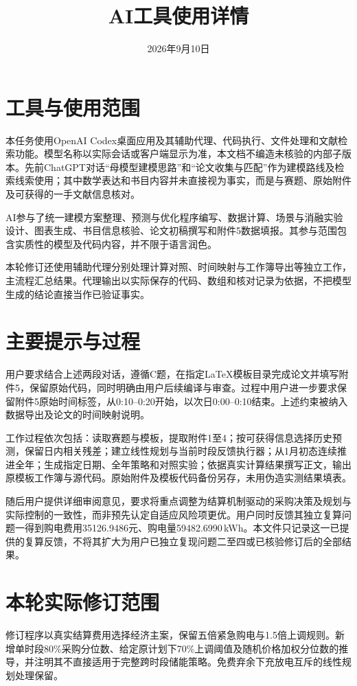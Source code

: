 \documentclass[UTF8,a4paper,11pt]{ctexart}
\title{AI工具使用详情}
\author{}
\date{2026年9月10日}
\begin{document}
\maketitle

\section{工具与使用范围}
本任务使用OpenAI Codex桌面应用及其辅助代理、代码执行、文件处理和文献检索功能。模型名称以实际会话或客户端显示为准，本文档不编造未核验的内部子版本。先前ChatGPT对话“母模型建模思路”和“论文收集与匹配”作为建模路线及检索线索使用；其中数学表达和书目内容并未直接视为事实，而是与赛题、原始附件及可获得的一手文献信息核对。

AI参与了统一建模方案整理、预测与优化程序编写、数据计算、场景与消融实验设计、图表生成、书目信息核验、论文初稿撰写和附件5数据填报。其参与范围包含实质性的模型及代码内容，并不限于语言润色。

本轮修订还使用辅助代理分别处理计算对照、时间映射与工作簿导出等独立工作，主流程汇总结果。代理输出以实际保存的代码、数组和核对记录为依据，不把模型生成的结论直接当作已验证事实。

\section{主要提示与过程}
用户要求结合上述两段对话，遵循C题，在指定LaTeX模板目录完成论文并填写附件5，保留原始代码，同时明确由用户后续编译与审查。过程中用户进一步要求保留附件5原始时间标签，从0:10--0:20开始，以次日0:00--0:10结束。上述约束被纳入数据导出及论文的时间映射说明。

工作过程依次包括：读取赛题与模板，提取附件1至4；按可获得信息选择历史预测，保留日内相关残差；建立线性规划与当前时段反馈执行器；从1月初态连续推进全年；生成指定日期、全年策略和对照实验；依据真实计算结果撰写正文，输出原模板工作簿与源代码。原始附件及模板代码备份另存，未用伪造实测结果填表。

随后用户提供详细审阅意见，要求将重点调整为结算机制驱动的采购决策及规划与实际控制的一致性，而非预先认定自适应风险项更优。用户同时反馈其独立复算问题一得到购电费用35126.9486元、购电量59482.6990\,kWh。本文件只记录这一已提供的复算反馈，不将其扩大为用户已独立复现问题二至四或已核验修订后的全部结果。

\section{本轮实际修订范围}
修订程序以真实结算费用选择经济主案，保留五倍紧急购电与1.5倍上调规则。新增单时段80\%采购分位数、给定原计划下70\%上调阈值及随机价格加权分位数的推导，并注明其不直接适用于完整跨时段储能策略。免费弃余下充放电互斥的线性规划处理保留。
\end{document}
